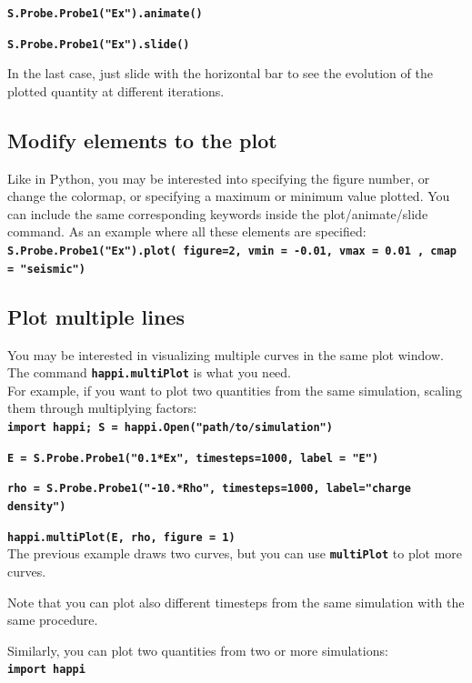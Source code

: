 \documentclass{article}
\newcommand{\commandline}[1]{\texttt{\textbf{#1}}}
\begin{document}
\commandline{S.Probe.Probe1("Ex").animate()}

\commandline{S.Probe.Probe1("Ex").slide()}

In the last case, just slide with the horizontal bar to see the evolution of the plotted quantity at different iterations.

\subsection*{Modify elements to the plot}
Like in Python, you may be interested into specifying the figure number, or change the colormap, or specifying a maximum or minimum value plotted. You can include the same corresponding keywords inside the plot/animate/slide command. As an example where all these elements are specified:\\

\commandline{S.Probe.Probe1("Ex").plot( figure=2, vmin = -0.01, vmax  = 0.01 , cmap = "seismic")}

\subsection*{Plot multiple lines}
You may be interested in visualizing multiple curves in the same plot window. The command \commandline{happi.multiPlot} is what you need.\\

For example, if you want to plot two quantities from the same simulation, scaling them through multiplying factors:\\

\commandline{import happi; S =  happi.Open("path/to/simulation")}

\commandline{E = S.Probe.Probe1("0.1*Ex", timesteps=1000, label = "E")}

\commandline{rho = S.Probe.Probe1("-10.*Rho", timesteps=1000, label="charge density")}

\commandline{happi.multiPlot(E, rho, figure = 1)}\\

The previous example draws two  curves, but you can use \commandline{multiPlot} to plot more curves.

Note that you can plot also different timesteps from the same simulation with the same procedure. 

Similarly, you can plot two quantities from two or more  simulations:\\

\commandline{import happi}
\end{document}
